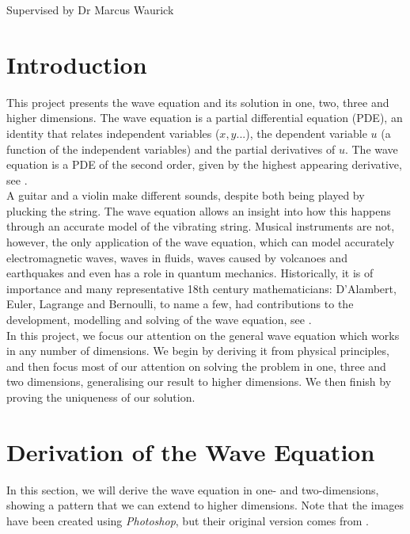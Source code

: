 \documentclass[a4paper, 12pt]{article}
\numberwithin{equation}{section}
\begin{document}
    \vspace*{5cm}
    Supervised by Dr Marcus Waurick
    \newpage
    \normalsize
    \tableofcontents
    \newpage

\section{Introduction}
This project presents the wave equation and its solution in one, two, three and higher dimensions. The wave equation is a partial differential equation (PDE), an identity
that relates independent variables ($x, y...$), the dependent variable $u$ (a function of the independent variables) and the partial derivatives of $u$. The wave 
equation is a PDE of the second order, given by the highest appearing derivative, see \cite{Fol}.
\\

A guitar and a violin make different sounds, despite both being played by plucking the string. The wave equation allows an insight into how this happens through an
accurate model of the vibrating string. Musical instruments are not, however, the  only application of the wave equation, which can model accurately electromagnetic 
waves, waves in fluids, waves caused by volcanoes and earthquakes and even has a role in quantum mechanics. Historically, it is of importance and many representative 18th century
mathematicians: D'Alambert, Euler, Lagrange and Bernoulli, to name a few, had contributions to the development, modelling and solving of the wave equation, see \cite{Coc}.
\\

In this project, we focus our attention on the general wave equation which works in any number of dimensions. We begin by deriving it from physical principles, and then 
focus most of our attention on solving the problem in one, three and two dimensions, generalising our result to higher dimensions. We then finish by proving the uniqueness 
of our solution.

\section{Derivation of the Wave Equation}
In this section, we will derive the wave equation in one- and two-dimensions, showing a pattern that 
we can extend to higher dimensions. Note that the images have been created using \emph{Photoshop}, but their original version comes from \cite{Kr}.
\end{document}
